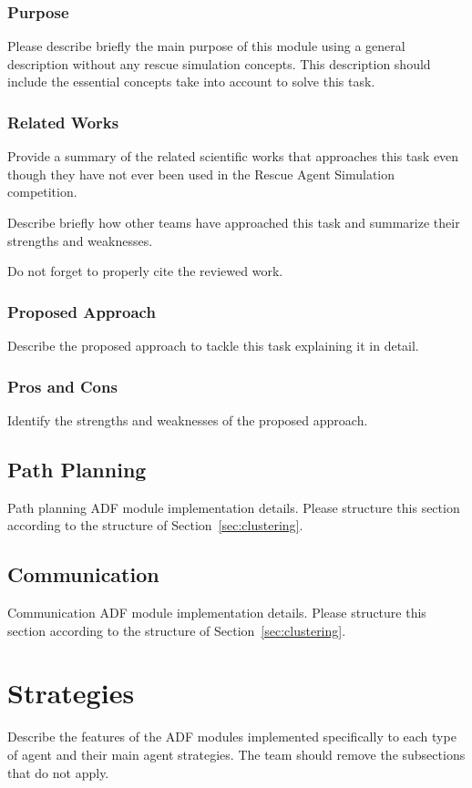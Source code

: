 \documentclass[runningheads,a4paper]{llncs}
\begin{document}
\subsubsection{Purpose}
\label{sec:clustering:purpose}
Please describe briefly the main purpose of this module using a general description without any rescue simulation concepts. This description should include the essential concepts take into account to solve this task.
\subsubsection{Related Works}
\label{sec:clustering:related}
Provide a summary of the related scientific works that approaches this task even though they have not ever been used in the Rescue Agent Simulation competition.

Describe briefly how other teams have approached this task and summarize their strengths and weaknesses.

Do not forget to properly cite the reviewed work.
\subsubsection{Proposed Approach}
\label{sec:clustering:proposed}
Describe the proposed approach to tackle this task explaining it in detail.
\subsubsection{Pros and Cons}
\label{sec:clustering:pros-cons}
Identify the strengths and weaknesses of the proposed approach.
\subsection{Path Planning}
\label{sec:path}
Path planning ADF module implementation details. Please structure this section according to the structure of Section~\ref{sec:clustering}.
\subsection{Communication}
\label{sec:comm}
Communication ADF module implementation details. Please structure this section according to the structure of Section~\ref{sec:clustering}.
\section{Strategies}
\label{sec:strategies}
Describe the features of the ADF modules implemented specifically to each type of agent and their main agent strategies. The team should remove the subsections that do not apply.
\end{document}
